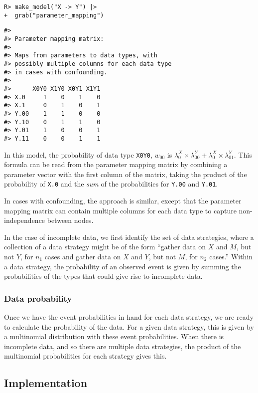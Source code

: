 \documentclass[
  11pt,
  article]{jss}
\begin{document}
\begin{verbatim}
R> make_model("X -> Y") |> 
+  grab("parameter_mapping") 
\end{verbatim}

\begin{verbatim}
#> 
#> Parameter mapping matrix: 
#> 
#> Maps from parameters to data types, with 
#> possibly multiple columns for each data type 
#> in cases with confounding. 
#> 
#>      X0Y0 X1Y0 X0Y1 X1Y1
#> X.0     1    0    1    0
#> X.1     0    1    0    1
#> Y.00    1    1    0    0
#> Y.10    0    1    1    0
#> Y.01    1    0    0    1
#> Y.11    0    0    1    1
\end{verbatim}

In this model, the probability of data type \texttt{X0Y0}, \(w_{00}\) is
\(\lambda^X_0\times \lambda^Y_{00} + \lambda^X_0\times \lambda^Y_{01}\).
This formula can be read from the parameter mapping matrix by combining
a parameter vector with the first column of the matrix, taking the
product of the probability of \texttt{X.0} and the \emph{sum} of the
probabilities for \texttt{Y.00} and \texttt{Y.01}.

In cases with confounding, the approach is similar, except that the
parameter mapping matrix can contain multiple columns for each data type
to capture non-independence between nodes.

In the case of incomplete data, we first identify the set of data
strategies, where a collection of a data strategy might be of the form
``gather data on \(X\) and \(M\), but not \(Y\), for \(n_1\) cases and
gather data on \(X\) and \(Y\), but not \(M\), for \(n_2\) cases.''
Within a data strategy, the probability of an observed event is given by
summing the probabilities of the types that could give rise to
incomplete data.

\hypertarget{data-probability}{%
\subsubsection{Data probability}\label{data-probability}}

Once we have the event probabilities in hand for each data strategy, we
are ready to calculate the probability of the data. For a given data
strategy, this is given by a multinomial distribution with these event
probabilities. When there is incomplete data, and so there are multiple
data strategies, the product of the multinomial probabilities for each
strategy gives this.

\hypertarget{implementation}{%
\subsection{Implementation}\label{implementation}}
\end{document}
